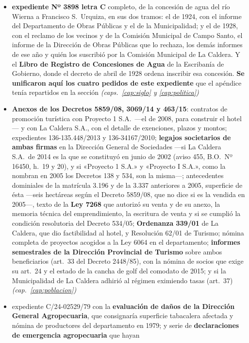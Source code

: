\begin{itemize}[leftmargin=*]
\item \textbf{expediente Nº 3898 letra C} completo, de la concesión de agua del río Wierna a Francisco S.\ Urquiza, en sus dos tramos: el de 1924, con el informe del Departamento de Obras Públicas y el de la Municipalidad; y el de 1928, con el reclamo de los vecinos y de la Comisión Municipal de Campo Santo, el informe de la Dirección de Obras Públicas que lo rechaza, los demás informes de ese año y quién los suscribió por la Comisión Municipal de La Caldera. Y el \textbf{Libro de Registro de Concesiones de Agua} de la Escribanía de Gobierno, donde el decreto de abril de 1928 ordena inscribir esa concesión. \textbf{Se unificaron aquí los cuatro pedidos de este expediente} que el apéndice tenía repartidos en la sección \textit{(caps.\ \ref{cap:siglo} y \ref{cap:politica})}
\item \textbf{Anexos de los Decretos 5859/08, 3069/14 y 463/15}: contratos de promoción turística con Proyecto 1 S.A.\ ---el de 2008, para construir el hotel--- y con La Caldera S.A., con el detalle de exenciones, plazos y montos; expedientes 136-135.448/2013 y 136-34167/2010; \textbf{legajos societarios de ambas firmas} en la Dirección General de Sociedades ---si La Caldera S.A.\ de 2014 es la que se constituyó en junio de 2002 (aviso 455, B.O.\ Nº 16450, h.\ 19 y 20), y si «Proyecto 1 S.A.» y «Proyecto I S.A.», como la nombran en 2005 los Decretos 138 y 534, son la misma---; antecedentes dominiales de la matrícula 3.196 y de la 3.337 anteriores a 2005, superficie de ésta ---seis hectáreas según el Decreto 5859/08, que no dice si es la vendida en 2005---, texto de la \textbf{Ley 7268} que autorizó su venta y de su anexo, la memoria técnica del emprendimiento, la escritura de venta y si se cumplió la condición resolutoria del Decreto 534/05; \textbf{Ordenanza 339/01} de La Caldera, que dio factibilidad al hotel, y Resolución 62/01 de Turismo; nómina completa de proyectos acogidos a la Ley 6064 en el departamento; \textbf{informes semestrales de la Dirección Provincial de Turismo} sobre ambos beneficiarios (art.\ 33 del Decreto 2448/85), con la nómina de socios que exige su art.\ 24 y el estado de la cancha de golf del comodato de 2015; y si la Municipalidad de La Caldera adhirió al régimen eximiendo tasas (art.\ 37) \textit{(cap.\ \ref{cap:poblacion})}
\item expediente C/24-02529/79 con la \textbf{evaluación de daños de la Dirección General
Agropecuaria}, que consignaría superficie tabacalera afectada y nómina de productores del
departamento en 1979; y serie de \textbf{declaraciones de emergencia agropecuaria} que hayan

\end{itemize}
